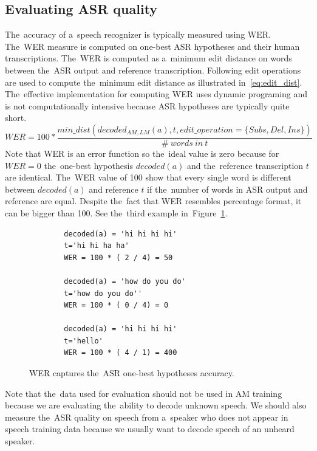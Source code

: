 \subsection[Evaluating \acs{ASR} quality]{Evaluating \acl{ASR} quality}
\label{sub:eval}
The~accuracy of a~speech recognizer is typically measured using \acl{WER}.
The~\ac{WER} measure is computed on one-best \ac{ASR} hypotheses and their human transcriptions.
The~\ac{WER} is computed as a~minimum edit distance on words between the~\ac{ASR} output and reference transcription.
Following edit operations are used  to compute the~minimum edit distance as illustrated in~\ref{eq:edit_dist}.
The~effective implementation for computing WER uses dynamic programing and is not computationally intensive because \ac{ASR} hypotheses are typically quite short.
\begin{equation} \label{eq:edit_dist}
    WER = 100* \frac{min\_dist(decoded_{AM, LM}(a), t, edit\_operation=\{Subs, Del, Ins\})}{\#\ words\ in\ t}
\end{equation}
Note that \ac{WER} is an error function so the~ideal value is zero because for $WER=0$ the~one-best hypothesis $decoded(a)$ and the~reference transcription $t$ are identical.
The~\ac{WER} value of 100 show that every single word is different between $decoded(a)$ and reference $t$ if the~number of words in \ac{ASR} output and reference are equal.
Despite the~fact that \ac{WER} resembles percentage format, it can be bigger than 100. 
See the~third example in~Figure~\ref{fig:wer400}.
\begin{figure}[!htp]
    \begin{center}
    \begin{verbatim}
        decoded(a) = 'hi hi hi hi'
        t='hi hi ha ha'
        WER = 100 * ( 2 / 4) = 50 

        decoded(a) = 'how do you do'
        t='how do you do''
        WER = 100 * ( 0 / 4) = 0

        decoded(a) = 'hi hi hi hi'
        t='hello'
        WER = 100 * ( 4 / 1) = 400
    \end{verbatim}
    \caption{\acs{WER} captures the~\ac{ASR} one-best hypotheses accuracy.}
    \label{fig:wer400} 
    \end{center}
\end{figure}

Note that the~data used for evaluation should not be used in \ac{AM} training because we are evaluating the~ability to decode unknown speech.
We should also measure the~\ac{ASR} quality on speech from a~speaker who does not appear in speech training data because we usually want to decode speech of an unheard speaker.

